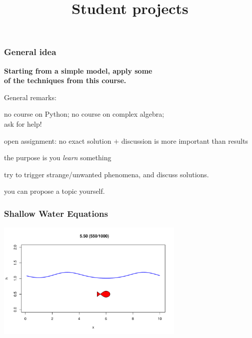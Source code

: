 \documentclass[aspectratio=43,9pt]{beamer}
\title{Student projects}%
\begin{document}
%
%
\begin{frame}[plain]
	\titlepage
\end{frame}
%
%
%
%
%
\begin{frame}
	\frametitle{General idea}
	\begin{center}
		\bf Starting from a simple model, apply some\\
		of the techniques from this course.
	\end{center}
	\par\vspace*{4ex}
	General remarks:
	\begin{myitemize}{1ex}
		\item no course on Python; no course on complex algebra;\\ask for help!
		\item open assignment: no exact solution $+$ discussion is more important than results
		\item the purpose is you \emph{learn} something
		\item try to trigger strange/unwanted phenomena, and discuss solutions.
		\item you can propose a topic yourself.
	\end{myitemize}
\end{frame}
%
%
\begin{frame}
	\frametitle{Shallow Water Equations}
	\begin{center}
		\includegraphics[width=9cm]{swe1D}
	\end{center}
\end{frame}
\end{document}
